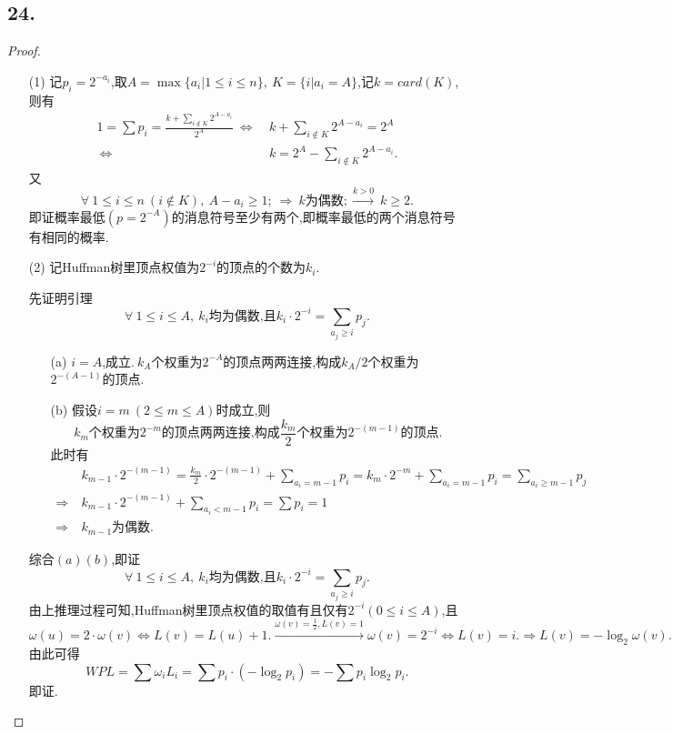\documentclass{article}
\begin{document}
\subsection*{24.}
\begin{proof}
    \begin{enumerate}
        \item []
        \item [(1)]记$p_i=2^{-a_i}$,取$A=\max\{ a_i|1\leq i \leq n\},\ K=\{i|a_i=A\}$,记$k=card(K)$,则有
        \begin{align*}
            1=\sum p_i=\displaystyle{\frac{k+\sum\limits_{i\notin K} 2^{A-a_i}}{2^A}}
            \ \Leftrightarrow\ &k+\sum\limits_{i\notin K} 2^{A-a_i}=2^A\\
            \ \Leftrightarrow\ &k=2^A-\sum\limits_{i\notin K} 2^{A-a_i}.
        \end{align*}
        又
        \[
            \forall\ 1\leq i\leq n\ (i\notin K),\ A-a_i\geq 1;\ 
            \Rightarrow\ k\mbox{为偶数};
            \xrightarrow{k>0}\ k\geq 2.
        \]
        即证概率最低$(p=2^{-A})$的消息符号至少有两个,即概率最低的两个消息符号有相同的概率.
        \item [(2)]记Huffman树里顶点权值为$2^{-i}$的顶点的个数为$k_i$.
        
        先证明引理\[\forall\ 1\leq i\leq A,\ k_i \mbox{均为偶数,且}k_i \cdot 2^{-i}=\sum\limits_{a_j\geq i}p_j.\]
        \begin{enumerate}
            \item [(a)]$i=A$,成立.$\ k_A$个权重为$2^{-A}$的顶点两两连接,构成$k_A /2$个权重为$2^{-(A-1)}$的顶点.
            \item [(b)]假设$i=m\ (2\leq m \leq A)$时成立,则
            \[k_m\mbox{个权重为}2^{-m}\mbox{的顶点两两连接,构成}\frac{k_m}{2}\mbox{个权重为}2^{-(m-1)}\mbox{的顶点}.\]
            此时有
            \begin{align*}
                &k_{m-1}\cdot 2^{-(m-1)}=\frac{k_m}{2} \cdot 2^{-(m-1)}+\sum\limits_{a_i=m-1} p_i=k_m\cdot 2^{-m}+\sum\limits_{a_i=m-1}p_i=\sum\limits_{a_i\geq m-1}p_j\\
                \Rightarrow\ &k_{m-1}\cdot 2^{-(m-1)}+\sum\limits_{a_i<m-1} p_i=\sum p_i=1\\
                \Rightarrow\ &k_{m-1}\mbox{为偶数}.
            \end{align*}
        \end{enumerate}
        综合$(a)(b)$,即证\[\forall\ 1\leq i\leq A,\ k_i \mbox{均为偶数,且}k_i \cdot 2^{-i}=\sum\limits_{a_j\geq i}p_j.\]
        由上推理过程可知,Huffman树里顶点权值的取值有且仅有$2^{-i}(0\leq i\leq A)$,且
        \[
            \omega(u)=2\cdot\omega(v)\Leftrightarrow L(v)=L(u)+1.
            \xrightarrow{\omega(v)=\frac{1}{2},L(v)=1}
            \omega(v)=2^{-i} \Leftrightarrow L(v)=i.
            \Rightarrow L(v)=-\log_2 \omega(v).
        \]
        由此可得
        \[
            WPL=\sum \omega_i L_i=\sum p_i\cdot \left(-\log_2 p_i \right)=-\sum p_i \log_2 p_i .
        \]
        即证.
    \end{enumerate}
\end{proof}
\end{document}

